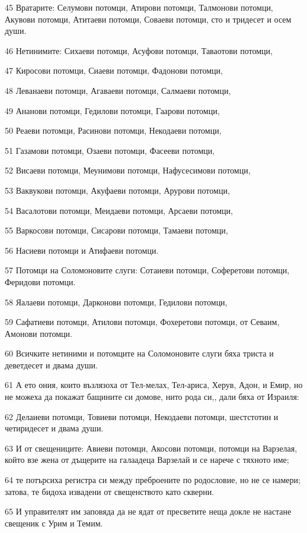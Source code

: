 \par 45 Вратарите: Селумови потомци, Атирови потомци, Талмонови потомци, Акувови потомци, Атитаеви потомци, Соваеви потомци, сто и тридесет и осем души.
\par 46 Нетинимите: Сихаеви потомци, Асуфови потомци, Таваотови потомци,
\par 47 Киросови потомци, Сиаеви потомци, Фадонови потомци,
\par 48 Леванаеви потомци, Агаваеви потомци, Салмаеви потомци,
\par 49 Ананови потомци, Гедилови потомци, Гаарови потомци,
\par 50 Реаеви потомци, Расинови потомци, Некодаеви потомци,
\par 51 Газамови потомци, Озаеви потомци, Фасееви потомци,
\par 52 Висаеви потомци, Меунимови потомци, Нафусесимови потомци,
\par 53 Ваквукови потомци, Акуфаеви потомци, Арурови потомци,
\par 54 Васалотови потомци, Меидаеви потомци, Арсаеви потомци,
\par 55 Варкосови потомци, Сисарови потомци, Тамаеви потомци,
\par 56 Насиеви потомци и Атифаеви потомци.
\par 57 Потомци на Соломоновите слуги: Сотаиеви потомци, Соферетови потомци, Феридови потомци.
\par 58 Яалаеви потомци, Дарконови потомци, Гедилови потомци,
\par 59 Сафатиеви потомци, Атилови потомци, Фохеретови потомци, от Севаим, Амонови потомци.
\par 60 Всичките нетиними и потомците на Соломоновите слуги бяха триста и деветдесет и двама души.
\par 61 А ето ония, които възлязоха от Тел-мелах, Тел-ариса, Херув, Адон, и Емир, но не можеха да покажат бащините си домове, нито рода си,, дали бяха от Израиля:
\par 62 Делаиеви потомци, Товиеви потомци, Некодаеви потомци, шестстотин и четиридесет и двама души.
\par 63 И от свещениците: Авиеви потомци, Акосови потомци, потомци на Варзелая, който взе жена от дъщерите на галаадеца Варзелай и се нарече с тяхното име;
\par 64 те потърсиха регистра си между преброените по родословие, но не се намери; затова, те бидоха извадени от свещенството като скверни.
\par 65 И управителят им заповяда да не ядат от пресветите неща докле не настане свещеник с Урим и Темим.
